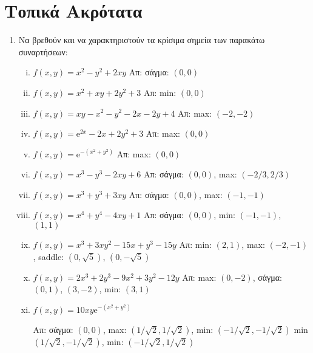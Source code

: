 \documentclass[a4paper,table]{report}
\begin{document}
\begin{center}
  \minibox{\large \bfseries \textcolor{Col1}{Ασκήσεις στα Ακρότατα}}
\end{center}

\vspace{\baselineskip}

\section*{Τοπικά Ακρότατα}

\begin{enumerate}
  \item Να βρεθούν και να χαρακτηριστούν τα κρίσιμα σημεία  των παρακάτω συναρτήσεων:
    \begin{enumerate}[i)]
      \item $ f(x,y) = x^{2}-y^{2}+2xy $
        \hfill Απ:  σάγμα: $(0,0) $ 
      \item $ f(x,y) = x^{2}+xy+2y^{2}+3 $
        \hfill Απ:  min: $(0,0) $ 
      \item $ f(x,y) = xy-x^{2}-y^2-2x-2y+4 $
        \hfill Απ: max: $(-2,-2)  $
      \item $ f(x,y) = \mathrm{e}^{2x} - 2x+2y^{2}+3 $
        \hfill Απ:  max: $(0,0) $ 
      \item $ f(x,y) = \mathrm{e}^{-(x^{2}+y^{2})} $
        \hfill Απ:  max: $(0,0) $ 
      \item $ f(x,y) = x^{3}-y^{3}-2xy+6 $
        \hfill Απ: σάγμα: $ (0,0) $, max: $ (-2/3, 2/3) $  
      \item $ f(x,y) = x^{3}+y^{3}+3xy $ 
        \hfill Απ: σάγμα: $ (0,0) $, max: $ (-1,-1) $ 
      \item $ f(x,y) = x^{4}+y^{4}-4xy+1 $
        \hfill Απ:  σάγμα: $(0,0) $,  min: $(-1,-1) $, $(1,1)  $ 
      \item $ f(x,y) = x^{3}+3xy^{2}-15x+y^{3}-15y $
        \hfill Απ: min: $ (2,1) $, max: $ (-2,-1) $, saddle: $ (0, \sqrt{5}) $, $ (0,-
        \sqrt{5}) $
      \item $ f(x,y) = 2x^{3}+2y^{3}-9x^{2}+3y^{2}-12y $
        \hfill Απ: max: $ (0,-2) $, σάγμα: $ (0,1) $, $ (3,-2) $, min: $ (3,1) $ 
      \item $ f(x,y) = 10xy \mathrm{e}^{-(x^{2}+y^2)} $


        \hfill Απ: σάγμα: $(0,0) $, 
        max: $(1/ \sqrt{2} , 1/ \sqrt{2}) $, min: $ (-1/ \sqrt{2}, -1/ \sqrt{2}) $  
        min $(1/ \sqrt{2} , -1/ \sqrt{2}) $, min: $ (-1/ \sqrt{2}, 1/ \sqrt{2}) $  
    \end{enumerate}


\end{enumerate}
\end{document}
